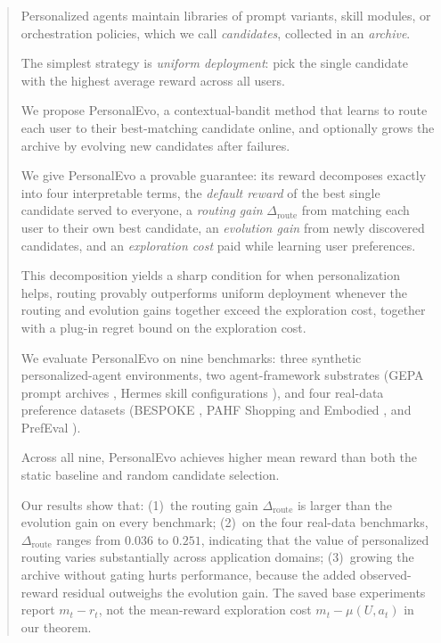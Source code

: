 \documentclass{article} %
\begin{document}
\begin{abstract}
Personalized agents maintain libraries of prompt variants, skill modules, or orchestration policies, which we call \emph{candidates}, collected in an \emph{archive}.

The simplest strategy is \emph{uniform deployment}: pick the single candidate with the highest average reward across all users.

We propose PersonalEvo, a contextual-bandit method that learns to route each user to their best-matching candidate online, and optionally grows the archive by evolving new candidates after failures.

We give PersonalEvo a provable guarantee: its reward decomposes exactly into four interpretable terms, the \emph{default reward} of the best single candidate served to everyone, a \emph{routing gain} $\Delta_{\mathrm{route}}$ from matching each user to their own best candidate, an \emph{evolution gain} from newly discovered candidates, and an \emph{exploration cost} paid while learning user preferences.

This decomposition yields a sharp condition for when personalization helps, routing provably outperforms uniform deployment whenever the routing and evolution gains together exceed the exploration cost, together with a plug-in regret bound on the exploration cost.

We evaluate PersonalEvo on nine benchmarks: three synthetic personalized-agent environments, two agent-framework substrates (GEPA prompt archives \citep{agrawal2025geparp}, Hermes skill configurations \citep{hermes_selfevolution}), and four real-data preference datasets (BESPOKE \citep{jin2026personalizing}, PAHF Shopping and Embodied \citep{pahf2025}, and PrefEval \citep{zhao2025prefeval}).

Across all nine, PersonalEvo achieves higher mean reward than both the static baseline and random candidate selection.

Our results show that: (1)~the routing gain $\Delta_{\mathrm{route}}$ is larger than the evolution gain on every benchmark; (2)~on the four real-data benchmarks, $\Delta_{\mathrm{route}}$ ranges from $0.036$ to $0.251$, indicating that the value of personalized routing varies substantially across application domains; (3)~growing the archive without gating hurts performance, because the added observed-reward residual outweighs the evolution gain. The saved base experiments report \(m_t-r_t\), not the mean-reward exploration cost \(m_t-\mu(U,a_t)\) in our theorem.


\end{abstract}
\end{document}
